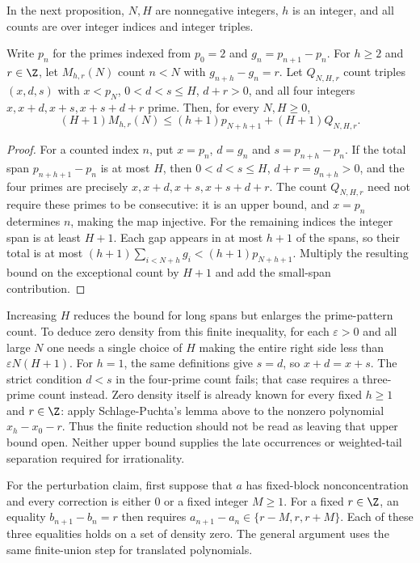 In the next proposition, $N,H$ are nonnegative integers, $h$ is an
integer, and all counts are over integer indices and integer triples.

\begin{proposition}\label{long251:res:shiftedcount}
Write $p_n$ for the primes indexed from $p_0=2$ and $g_n=p_{n+1}-p_n$.
For $h\ge2$ and $r\in\Z$, let $M_{h,r}(N)$ count $n<N$ with $g_{n+h}-g_n=r$.
Let $Q_{N,H,r}$ count triples $(x,d,s)$ with $x<p_N$,
$0<d<s\le H$, $d+r>0$, and all four integers
$x,x+d,x+s,x+s+d+r$ prime. Then, for every $N,H\ge0$,
\[
 (H+1)M_{h,r}(N)\le
 (h+1)p_{N+h+1}+(H+1)Q_{N,H,r}.
\]
\end{proposition}

\begin{proof}
For a counted index $n$, put $x=p_n$, $d=g_n$ and
$s=p_{n+h}-p_n$.  If the total span $p_{n+h+1}-p_n$ is at most $H$,
then $0<d<s\le H$, $d+r=g_{n+h}>0$, and the four primes are precisely
$x,x+d,x+s,x+s+d+r$.  The count $Q_{N,H,r}$ need not require these
primes to be consecutive: it is an upper bound, and $x=p_n$ determines
$n$, making the map injective.  For the remaining indices the integer
span is at least $H+1$.
Each gap appears in at most $h+1$ of the spans, so their total is at most
$(h+1)\sum_{i<N+h}g_i<(h+1)p_{N+h+1}$.  Multiply the resulting bound
on the exceptional count by $H+1$ and add the small-span contribution.
\end{proof}

Increasing $H$ reduces the bound for long spans but enlarges the
prime-pattern count.  To deduce zero density from this finite inequality,
for each $\varepsilon>0$ and all large $N$ one needs a single choice of
$H$ making the entire right side less than $\varepsilon N(H+1)$.  For $h=1$, the same definitions give $s=d$, so $x+d=x+s$.
The strict condition $d<s$ in the four-prime count fails; that case
requires a three-prime count instead.
Zero density itself is already known for every fixed $h\ge1$ and
$r\in\Z$: apply Schlage-Puchta's lemma above to the nonzero polynomial
$x_h-x_0-r$.  Thus the finite reduction should not be read as leaving
that upper bound open.  Neither upper bound supplies the late occurrences
or weighted-tail separation required for irrationality.

For the perturbation claim, first suppose that $a$ has fixed-block
nonconcentration and every correction is either $0$ or a fixed integer
$M\ge1$.  For a fixed $r\in\Z$, an equality $b_{n+1}-b_n=r$ then requires
$a_{n+1}-a_n\in\{r-M,r,r+M\}$.  Each of these three equalities holds on
a set of density zero.  The general argument uses the same finite-union
step for translated polynomials.

